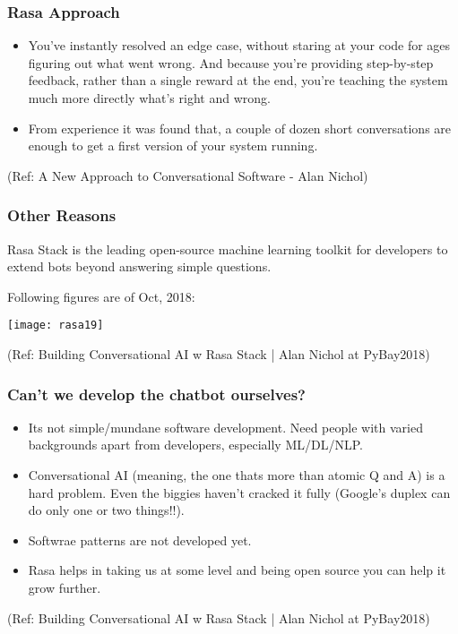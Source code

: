  \begin{frame}[fragile]\frametitle{Rasa Approach}
 

\begin{itemize}
\item You've instantly resolved an edge case, without staring at your code for ages figuring out what went wrong. And because you're providing step-by-step feedback, rather than a single reward at the end, you're teaching the system much more directly what's right and wrong.
\item  From experience it was found that, a couple of dozen short conversations are enough to get a first version of your system running.
\end{itemize}

{\tiny (Ref: A New Approach to Conversational Software - Alan Nichol)}


\end{frame}

 \begin{frame}[fragile]\frametitle{Other Reasons}

Rasa Stack is the leading open-source machine learning toolkit for developers to extend bots beyond answering simple questions.

Following figures are of Oct, 2018:

\begin{center}
\texttt{[image: rasa19]}
\end{center}


{\tiny (Ref: Building Conversational AI w Rasa Stack | Alan Nichol at PyBay2018)}

\end{frame}


 \begin{frame}[fragile]\frametitle{Can't we develop the chatbot ourselves?}

\begin{itemize}
\item Its not simple/mundane software development. Need people with varied backgrounds apart from developers, especially ML/DL/NLP.
\item Conversational AI (meaning, the one thats more than atomic Q and A) is a hard problem. Even the biggies haven't cracked it fully (Google's duplex can do only one or two things!!).
\item Softwrae patterns are not developed yet.
\item Rasa helps in taking us at some level and being open source you can help it grow further.
\end{itemize}


{\tiny (Ref: Building Conversational AI w Rasa Stack | Alan Nichol at PyBay2018)}

\end{frame}

